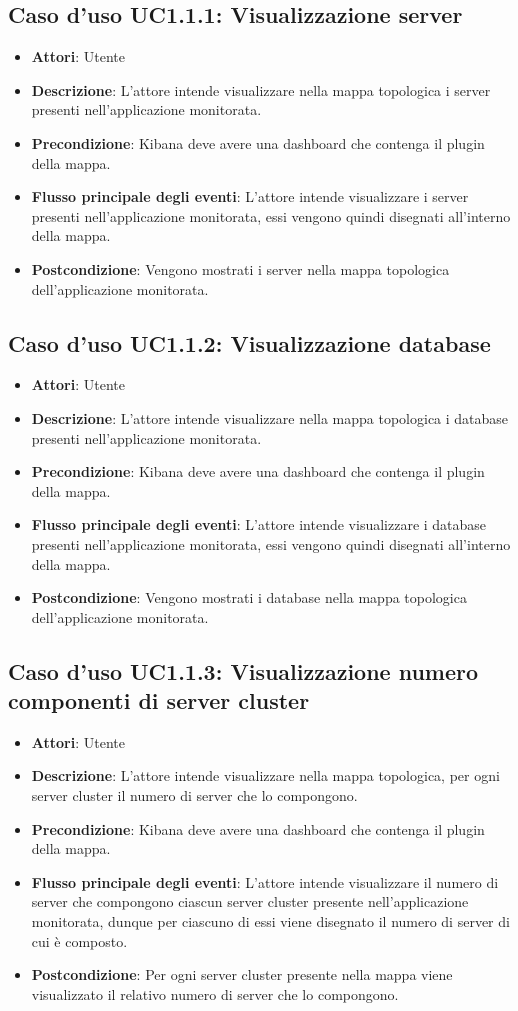 \subsection{Caso d'uso UC1.1.1: Visualizzazione server}
\begin{itemize}
\item \textbf{Attori}: Utente
\item \textbf{Descrizione}: L'attore intende visualizzare nella mappa topologica i server presenti nell'applicazione monitorata.
\item \textbf{Precondizione}: Kibana deve avere una dashboard che contenga il plugin della mappa.
\item \textbf{Flusso principale degli eventi}: L'attore intende visualizzare i server presenti nell'applicazione monitorata, essi vengono quindi disegnati all'interno della mappa.
\item \textbf{Postcondizione}: Vengono mostrati i server nella  mappa topologica dell'applicazione monitorata.
\end{itemize}
\subsection{Caso d'uso UC1.1.2: Visualizzazione database}
\begin{itemize}
\item \textbf{Attori}: Utente
\item \textbf{Descrizione}: L'attore intende visualizzare nella mappa topologica i database presenti nell'applicazione monitorata.
\item \textbf{Precondizione}: Kibana deve avere una dashboard che contenga il plugin della mappa.
\item \textbf{Flusso principale degli eventi}: L'attore intende visualizzare i database presenti nell'applicazione monitorata, essi vengono quindi disegnati all'interno della mappa.
\item \textbf{Postcondizione}: Vengono mostrati i database nella mappa topologica dell'applicazione monitorata.
\end{itemize}
\subsection{Caso d'uso UC1.1.3: Visualizzazione numero componenti di server cluster}
\begin{itemize}
\item \textbf{Attori}: Utente
\item \textbf{Descrizione}: L'attore intende visualizzare nella mappa topologica, per ogni server cluster il numero di server che lo compongono.
\item \textbf{Precondizione}: Kibana deve avere una dashboard che contenga il plugin della mappa.
\item \textbf{Flusso principale degli eventi}: L'attore intende visualizzare il numero di server che compongono ciascun server cluster presente nell'applicazione monitorata, dunque per ciascuno di essi viene disegnato il numero di server di cui è composto.
\item \textbf{Postcondizione}: Per ogni server cluster presente nella mappa viene visualizzato il relativo numero di server che lo compongono.
\end{itemize}
